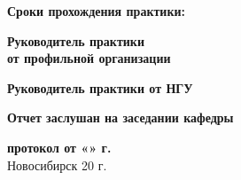 \documentclass{article}
\begin{document}
\begin{titlepage}
	\noindent
	\hrulefill

	\noindent
	\textbf{Сроки прохождения практики:} \underline{\hspace{5cm}}

	\noindent
	\textbf{Руководитель практики}\\
	\noindent
	\textbf{от профильной организации} \quad\quad{}\qquad{}

	\noindent
	\textbf{Руководитель практики от НГУ}\; \qquad{}

	\noindent
	\textbf{Отчет заслушан на заседании кафедры}

	\noindent
	\textbf{протокол \longunder{1.5cm} от \quad «\longunder{0.5cm}»\quad
		\longunder{4cm}\longunder{0.5cm} г.} \leavevmode\\

	{\centering Новосибирск 20\longunder{0.5cm} г. \\}
\end{titlepage}
\end{document}
